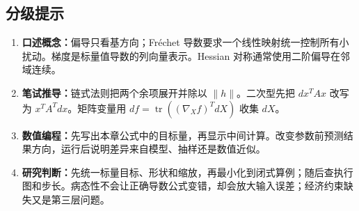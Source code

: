 \subsection*{分级提示}
\begingroup\small
\begin{enumerate}[nosep,leftmargin=*]
  \item \textbf{口述概念：}偏导只看基方向；Fréchet 导数要求一个线性映射统一控制所有小扰动。梯度是标量值导数的列向量表示。Hessian 对称通常使用二阶偏导在邻域连续。
  \item \textbf{笔试推导：}链式法则把两个余项展开并除以 $\lVert h\rVert$。二次型先把 $dx^TAx$ 改写为 $x^TA^Tdx$。矩阵变量用 $df=\operatorname{tr}((\nabla_Xf)^TdX)$ 收集 $dX$。
  \item \textbf{数值编程：}先写出本章公式中的目标量，再显示中间计算。改变参数前预测结果方向，运行后说明差异来自模型、抽样还是数值近似。
  \item \textbf{研究判断：}先统一标量目标、形状和缩放，再最小化到闭式算例；随后查执行图和步长。病态性不会让正确导数公式变错，却会放大输入误差；经济约束缺失又是第三层问题。
\end{enumerate}
\endgroup


\MFQMappedUpperChFiveHints
